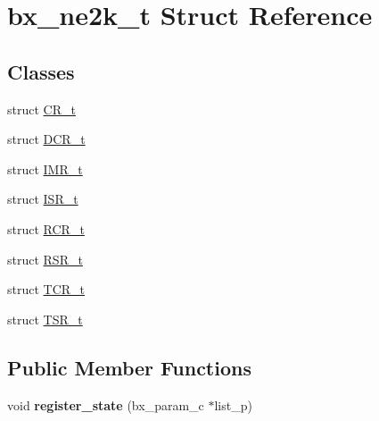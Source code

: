 \hypertarget{structbx__ne2k__t}{\section{bx\-\_\-ne2k\-\_\-t Struct Reference}
\label{structbx__ne2k__t}
}
\subsection*{Classes}
\begin{DoxyCompactItemize}
\item 
struct \hyperlink{structbx__ne2k__t_1_1CR__t}{C\-R\-\_\-t}
\item 
struct \hyperlink{structbx__ne2k__t_1_1DCR__t}{D\-C\-R\-\_\-t}
\item 
struct \hyperlink{structbx__ne2k__t_1_1IMR__t}{I\-M\-R\-\_\-t}
\item 
struct \hyperlink{structbx__ne2k__t_1_1ISR__t}{I\-S\-R\-\_\-t}
\item 
struct \hyperlink{structbx__ne2k__t_1_1RCR__t}{R\-C\-R\-\_\-t}
\item 
struct \hyperlink{structbx__ne2k__t_1_1RSR__t}{R\-S\-R\-\_\-t}
\item 
struct \hyperlink{structbx__ne2k__t_1_1TCR__t}{T\-C\-R\-\_\-t}
\item 
struct \hyperlink{structbx__ne2k__t_1_1TSR__t}{T\-S\-R\-\_\-t}
\end{DoxyCompactItemize}
\subsection*{Public Member Functions}
\begin{DoxyCompactItemize}
\item 
\hypertarget{structbx__ne2k__t_a92f7d0dca08d8ba53094c5e4abeb0aaa}{void {\bfseries register\-\_\-state} (bx\-\_\-param\-\_\-c $\ast$list\-\_\-p)}\label{structbx__ne2k__t_a92f7d0dca08d8ba53094c5e4abeb0aaa}

\end{DoxyCompactItemize}
